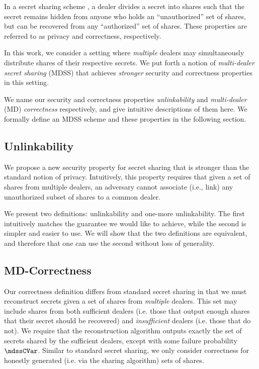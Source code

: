 In a secret sharing scheme \cite{Shamir79}, a dealer divides a secret into shares such that the secret remains hidden from anyone who holds an ``unauthorized'' set of shares, but can be recovered from any ``authorized'' set of shares.
These properties are referred to as privacy and correctness, respectively.

In this work, we consider a setting where {\em multiple} dealers may simultaneously distribute shares of their respective secrets.
We put forth a notion of {\em multi-dealer secret sharing} (MDSS) that achieves {\em stronger} security and correctness properties in this setting.

We name our security and correctness properties \emph{unlinkability} and \emph{multi-dealer} (MD) \emph{correctness} respectively, and give intuitive descriptions of them here.
We formally define an MDSS scheme and these properties in the following section.

\subsection{Unlinkability}
We propose a new security property for secret sharing that is stronger than the standard notion of privacy.
Intuitively, this property requires that given a set of shares from multiple dealers, an adversary cannot associate (i.e., link) any unauthorized subset of shares to a common dealer.

We present two definitions: unlinkability and one-more unlinkability. The first intuitively matches the  guarantee we would like to achieve, while the second is simpler and easier to use.
We will show that the two definitions are equivalent, and therefore that one can use the second without loss of generality.


\subsection{MD-Correctness}
Our correctness definition differs from standard secret sharing in that we must reconstruct secrets given a set of shares from \emph{multiple} dealers. This set may include shares from both sufficient dealers (i.e. those that output enough shares that their secret should be recovered) and \emph{insufficient} dealers (i.e. those that do not).
We require that the reconstruction algorithm outputs exactly the set of secrets shared by the sufficient dealers, except with some failure probability $\mdssCVar$.
Similar to standard secret sharing, we only consider correctness for honestly generated (i.e. via the sharing algorithm) sets of shares.

